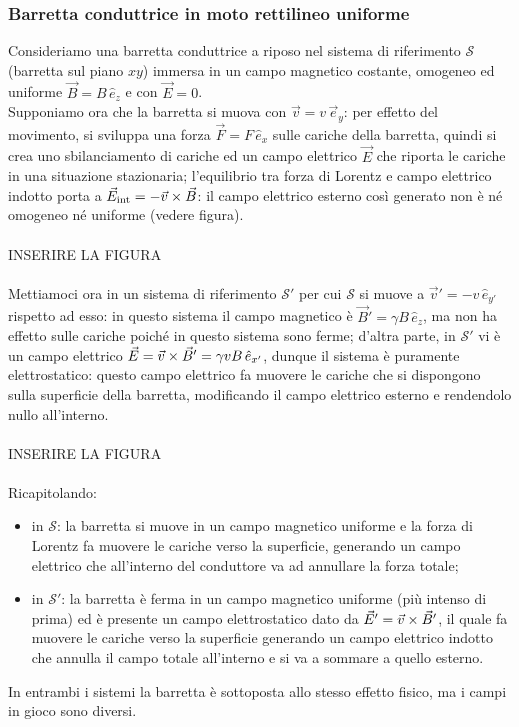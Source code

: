 \subsubsection{Barretta conduttrice in moto rettilineo uniforme}

Consideriamo una barretta conduttrice a riposo nel sistema di riferimento $ \mathcal{S} $ (barretta sul piano $ xy $) immersa in un campo magnetico costante, omogeneo ed uniforme $ \vec{B} = B\,\hat{e}_z $ e con $ \vec{E} = 0 $. \\ 
%
Supponiamo ora che la barretta si muova con $ \vec{v} = v \,\vec{e}_y $: per effetto del movimento, si sviluppa una forza $ \vec{F} = F \,\hat{e}_x $ sulle cariche della barretta, quindi si crea uno sbilanciamento di cariche ed un campo elettrico $ \vec{E} $ che riporta le cariche in una situazione stazionaria; l'equilibrio tra forza di Lorentz e campo elettrico indotto porta a $ \vec{E}_{\text{int}} = -\vec{v}\times\vec{B} $: il campo elettrico esterno così generato non è né omogeneo né uniforme (vedere figura). \\ 
%
%
%
\hbox{} \\ INSERIRE LA FIGURA \\ \hbox{} \\ 
%
%
%
Mettiamoci ora in un sistema di riferimento $ \mathcal{S}' $ per cui $ \mathcal{S} $ si muove a $ \vec{v}' = -v\,\hat{e}_{y'} $ rispetto ad esso: in questo sistema il campo magnetico è $ \vec{B}' = \gamma B \,\hat{e}_z $, ma non ha effetto sulle cariche poiché in questo sistema sono ferme; d'altra parte, in $ \mathcal{S}' $ vi è un campo elettrico $ \vec{E} = \vec{v}\times\vec{B}' = \gamma vB \,\hat{e}_{x'} $, dunque il sistema è puramente elettrostatico: questo campo elettrico fa muovere le cariche che si dispongono sulla superficie della barretta, modificando il campo elettrico esterno e rendendolo nullo all'interno. \\ 
%
%
%
\hbox{} \\ INSERIRE LA FIGURA \\ \hbox{} \\ 
%
%
%
Ricapitolando:
\begin{itemize}
	\item in $ \mathcal{S} $: la barretta si muove in un campo magnetico uniforme e la forza di Lorentz fa muovere le cariche verso la superficie, generando un campo elettrico che all'interno del conduttore va ad annullare la forza totale;
	\item in $ \mathcal{S}' $: la barretta è ferma in un campo magnetico uniforme (più intenso di prima) ed è presente un campo elettrostatico dato da $ \vec{E}' = \vec{v}\times\vec{B}' $, il quale fa muovere le cariche verso la superficie generando un campo elettrico indotto che annulla il campo totale all'interno e si va a sommare a quello esterno.
\end{itemize}
In entrambi i sistemi la barretta è sottoposta allo stesso effetto fisico, ma i campi in gioco sono diversi.
